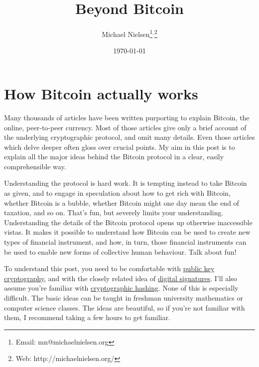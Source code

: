 \documentclass[12pt]{book}
\newcommand{\link}[2]{\href{#1}{#2}}
\begin{document}
\title{Beyond Bitcoin}
\author{Michael Nielsen\thanks{Email: mn@michaelnielsen.org}$^{,}$\thanks{Web: http://michaelnielsen.org/}}
\date{\today}

\maketitle

\pagestyle{headings}

\tableofcontents

\chapter{How Bitcoin actually works}

%
%
Many thousands of articles have been written purporting to explain
Bitcoin, the online, peer-to-peer currency.  Most of those articles
give only a brief account of the underlying cryptographic protocol,
and omit many details.  Even those articles which delve deeper often
gloss over crucial points.  My aim in this post is to explain all the
major ideas behind the Bitcoin protocol in a clear, easily
comprehensible way.

%
%
Understanding the protocol is hard work.  It is tempting instead to
take Bitcoin as given, and to engage in speculation about how to get
rich with Bitcoin, whether Bitcoin is a bubble, whether Bitcoin might
one day mean the end of taxation, and so on.  That's fun, but severely
limits your understanding.  Understanding the details of the Bitcoin
protocol opens up otherwise inaccessible vistas.  It makes it possible
to understand how Bitcoin can be used to create new types of financial
instrument, and how, in turn, those financial instruments can be used
to enable new forms of collective human behaviour.  Talk about fun!

%
%
To understand this post, you need to be comfortable with
\link{http://en.wikipedia.org/wiki/Public-key_cryptography}{public key
  cryptography}, and with the closely related idea of
\link{https://en.wikipedia.org/wiki/Digital_signature}{digital
  signatures}.  I'll also assume you're familiar with
\link{https://en.wikipedia.org/wiki/Cryptographic_hash_function}{cryptographic
  hashing}.  None of this is especially difficult.  The basic ideas
can be taught in freshman university mathematics or computer science
classes.  The ideas are beautiful, so if you're not familiar with
them, I recommend taking a few hours to get familiar.
\end{document}
